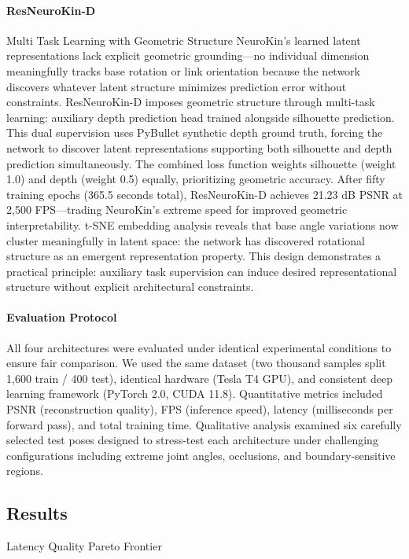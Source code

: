 ﻿\documentclass[11pt,a4paper]{article}
\begin{document}
\paragraph{ResNeuroKin-D} Multi Task Learning with Geometric Structure
NeuroKin's learned latent representations lack explicit geometric grounding—no individual dimension meaningfully tracks base rotation or link orientation because the network discovers whatever latent structure minimizes prediction error without constraints. ResNeuroKin-D imposes geometric structure through multi-task learning: auxiliary depth prediction head trained alongside silhouette prediction. This dual supervision uses PyBullet synthetic depth ground truth, forcing the network to discover latent representations supporting both silhouette and depth prediction simultaneously. The combined loss function weights silhouette (weight 1.0) and depth (weight 0.5) equally, prioritizing geometric accuracy. After fifty training epochs (365.5 seconds total), ResNeuroKin-D achieves 21.23 dB PSNR at 2,500 FPS—trading NeuroKin's extreme speed for improved geometric interpretability. t-SNE embedding analysis reveals that base angle variations now cluster meaningfully in latent space: the network has discovered rotational structure as an emergent representation property. This design demonstrates a practical principle: auxiliary task supervision can induce desired representational structure without explicit architectural constraints.

\paragraph{Evaluation Protocol}
All four architectures were evaluated under identical experimental conditions to ensure fair comparison. We used the same dataset (two thousand samples split 1,600 train / 400 test), identical hardware (Tesla T4 GPU), and consistent deep learning framework (PyTorch 2.0, CUDA 11.8). Quantitative metrics included PSNR (reconstruction quality), FPS (inference speed), latency (milliseconds per forward pass), and total training time. Qualitative analysis examined six carefully selected test poses designed to stress-test each architecture under challenging configurations including extreme joint angles, occlusions, and boundary-sensitive regions.

\subsection{Results} Latency Quality Pareto Frontier
\end{document}
